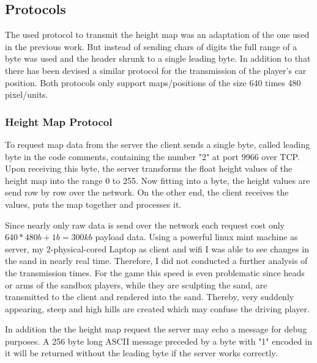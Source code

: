 \documentclass[12pt,a4paper,twoside,titlepage,headsepline,numbers=noenddot,listof=totoc,index=totoc,bibliography=totoc]{scrartcl}
\theoremstyle{break}
\begin{document}
\subsection{Protocols}
\label{ch:protocol}
The used protocol to transmit the height map was an adaptation of the one used in the previous work. But instead of sending chars of digits the full range of a byte was used and the header shrunk to a single leading byte. In addition to that there has been devised a similar protocol for the transmission of the player's car position.  
Both protocols only support maps/positions of the size 640 times 480 pixel/units.

\subsubsection{Height Map Protocol}
To request map data from the server the client sends a single byte, called leading byte in the code comments, containing the number "2" at port 9966 over TCP. Upon receiving this byte, the server transforms the float height values of the height map into the range 0 to 255. Now fitting into a byte, the height values are send row by row over the network. On the other end, the client receives the values, puts the map together and processes it. 

Since nearly only raw data is send over the network each request cost only $640*480b+1b=300kb$ payload data. Using a powerful linux mint machine as server, my 2-physical-cored Laptop as client and wifi I was able to see changes in the sand in nearly real time. Therefore, I did not conducted a further analysis of the transmission times. For the game this speed is even problematic since heads or arms of the sandbox players, while they are sculpting the sand, are transmitted to the client and rendered into the sand. Thereby, very suddenly appearing, steep and high hills are created which may confuse the driving player.

In addition the the height map request the server may echo a message for debug purposes. A 256 byte long ASCII message preceded by a byte with "1" encoded in it will be returned without the leading byte if the server works correctly.
\end{document}
